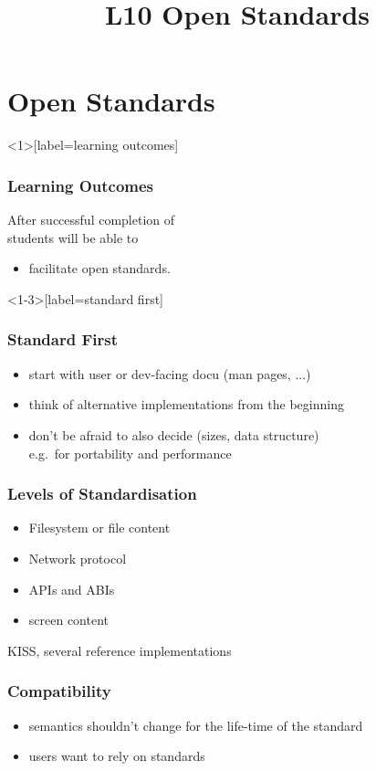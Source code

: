 

\title{L10 Open Standards}



\section{Open Standards}

\begin{frame}<1>[label=learning outcomes]
	\frametitle{Learning Outcomes}
	After successful completion of \inserttitle \\
	students will be able to

	\begin{itemize}
	\item facilitate open standards.
	\end{itemize}
\end{frame}

\begin{frame}<1-3>[label=standard first]
	\frametitle{Standard First}

	\begin{itemize}[<+-| alert@+>]
	\item start with user or dev-facing docu (man pages, ...)
	\item think of alternative implementations from the beginning
	\item don't be afraid to also decide (sizes, data structure) \\ e.g.\ for portability and performance
	\end{itemize}
\end{frame}

\begin{frame}
	\frametitle{Levels of Standardisation}

	\begin{itemize}[<+-| alert@+>]
	\item Filesystem or file content
	\item Network protocol
	\item APIs and ABIs
	\item screen content
	\end{itemize}
	
	\pause[\thebeamerpauses]  %

	KISS, several reference implementations
\end{frame}

\begin{frame}
	\frametitle{Compatibility}

	\begin{itemize}[<+-| alert@+>]
	\item semantics shouldn't change for the life-time of the standard
	\item users want to rely on standards
	\end{itemize}
\end{frame}

